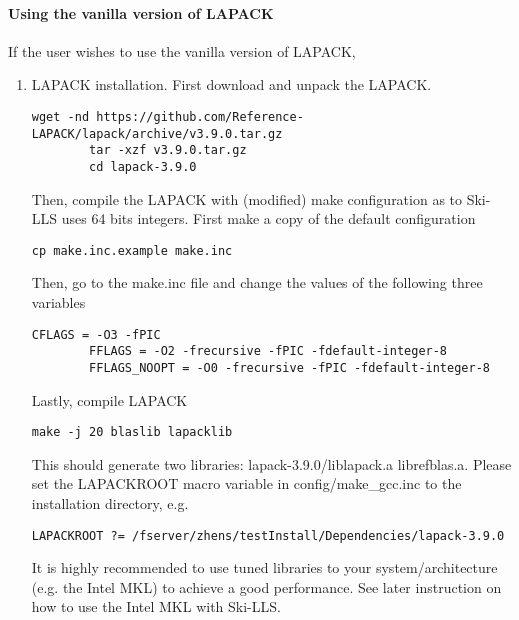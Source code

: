 \documentclass[english,11pt]{article}
\begin{document}
\paragraph{Using the vanilla version of LAPACK}
If the user wishes to use the vanilla version of LAPACK,
\begin{enumerate}
    \item LAPACK installation. First download and unpack the LAPACK.
        \begin{lstlisting}[breaklines=true, showstringspaces=false]
        wget -nd https://github.com/Reference-LAPACK/lapack/archive/v3.9.0.tar.gz
        tar -xzf v3.9.0.tar.gz
        cd lapack-3.9.0
        \end{lstlisting}
    Then, compile the LAPACK with (modified) make configuration as to Ski-LLS uses 64 bits integers. First make a copy of the default configuration
        \begin{lstlisting}[breaklines=true, showstringspaces=false]
        cp make.inc.example make.inc
        \end{lstlisting}
    Then, go to the make.inc file and change the values of the following three variables
        \begin{lstlisting}[breaklines=true, showstringspaces=false]
        CFLAGS = -O3 -fPIC
        FFLAGS = -O2 -frecursive -fPIC -fdefault-integer-8
        FFLAGS_NOOPT = -O0 -frecursive -fPIC -fdefault-integer-8
        \end{lstlisting}
    Lastly, compile LAPACK
        \begin{lstlisting}[breaklines=true, showstringspaces=false]
        make -j 20 blaslib lapacklib 
        \end{lstlisting}
    This should generate two libraries: lapack-3.9.0/liblapack.a librefblas.a. Please set the LAPACKROOT macro variable in config/make_gcc.inc to the installation directory, e.g.
        \begin{lstlisting}[breaklines=true, showstringspaces=false]
        LAPACKROOT ?= /fserver/zhens/testInstall/Dependencies/lapack-3.9.0
        \end{lstlisting}
    It is highly recommended to use tuned libraries to your system/architecture (e.g. the Intel MKL) to achieve a good performance. See later instruction on how to use the Intel MKL with Ski-LLS.
    

\end{enumerate}
\end{document}

